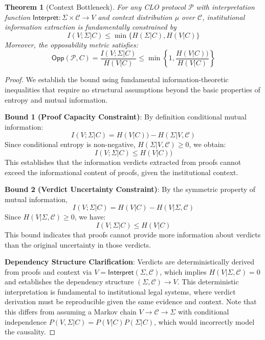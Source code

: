 \documentclass{ieeeaccess}
\newtheorem{theorem}{Theorem}[subsection]
\newtheorem{proof}{Proof}[section]
\begin{document}
\begin{theorem}[Context Bottleneck]\label{thm:context_bottleneck}
For any CLO protocol $\mathcal{P}$ with interpretation function $\mathsf{Interpret}: \Sigma \times \mathcal{C} \to V$ and context distribution $\mu$ over $\mathcal{C}$, institutional information extraction is fundamentally constrained by
\begin{equation}
I(V;\Sigma|C) \leq \min\{H(\Sigma|C), H(V|C)\}
\end{equation}
Moreover, the opposability metric satisfies:
\begin{equation}
\mathsf{Opp}(\mathcal{P}, C) = \frac{I(V;\Sigma|C)}{H(V|C)} \leq \min\left\{1, \frac{H(V|C))}{H(V|C)}\right\}
\end{equation}
\end{theorem}

\begin{proof}
We establish the bound using fundamental information-theoretic inequalities that require no structural assumptions beyond the basic properties of entropy and mutual information.

\textbf{Bound 1 (Proof Capacity Constraint)}: By definition conditional mutual information:
\begin{equation}
I(V;\Sigma|C) = H(V|C)) - H(\Sigma|V,\mathcal{C})
\end{equation}
Since conditional entropy is non-negative, $H(\Sigma|V,\mathcal{C}) \geq 0$, we obtain:
\begin{equation}
I(V;\Sigma|C) \leq H(V|C))
\end{equation}
This establishes that the information verdicts extracted from proofs cannot exceed the informational content of proofs, given the institutional context.

\textbf{Bound 2 (Verdict Uncertainty Constraint)}: By the symmetric property of mutual information,
\begin{equation}
I(V;\Sigma|C) = H(V|C) - H(V|\Sigma,\mathcal{C})
\end{equation}
Since $H(V|\Sigma,\mathcal{C}) \geq 0$, we have:
\begin{equation}
I(V;\Sigma|C) \leq H(V|C)
\end{equation}
This bound indicates that proofs cannot provide more information about verdicts than the original uncertainty in those verdicts.

\textbf{Dependency Structure Clarification}: Verdicts are deterministically derived from proofs and context via $V = \mathsf{Interpret}(\Sigma, \mathcal{C})$, which implies $H(V|\Sigma,\mathcal{C}) = 0$ and establishes the dependency structure 
$(\Sigma, \mathcal{C}) \to V$. This deterministic interpretation is fundamental to institutional legal systems, where verdict derivation must be reproducible given the same evidence and context. Note that this differs from assuming a 
Markov chain $V \to \mathcal{C} \to \Sigma$ with conditional independence $P(V,\Sigma|C) = P(V|C)P(\Sigma|C)$, which would incorrectly model the causality.


\end{proof}
\end{document}
